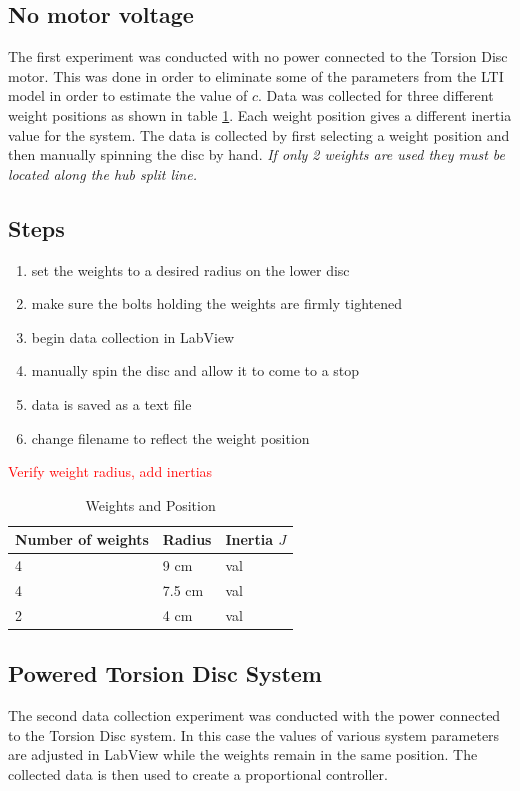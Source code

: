 \documentclass[11pt,titlepage]{article}
\begin{document}
	\subsection{No motor voltage}
		The first experiment was conducted with no power connected to the Torsion Disc motor. This was done in order to eliminate some of the parameters from the LTI model in order to estimate the value of $c$. Data was collected for three different weight positions as shown in table \ref{table:weight_pos}. Each weight position gives a different inertia value for the system. The data is collected by first selecting a weight position and then manually spinning the disc by hand. \emph{If only 2 weights are used they must be located along the hub split line.}
	\subsection*{Steps}
		\begin{enumerate}
			\item set the weights to a desired radius on the lower disc
			\item make sure the bolts holding the weights are firmly tightened
			\item begin data collection in LabView
			\item manually spin the disc and allow it to come to a stop
			\item data is saved as a text file
			\item change filename to reflect the weight position
		\end{enumerate}
			\textcolor{red}{Verify weight radius, add inertias}
		\begin{table}[h!]
			\centering
			\begin{tabular}{|m{4cm}|m{3cm}|m{3cm}|} 
				\hline
				Number of weights & Radius & Inertia $J$ \\ 
				\hline
				4 & 9 cm & val \\
				\hline
				4 & 7.5 cm & val\\
				\hline
				2 & 4 cm & val \\
				\hline
			\end{tabular}
			\caption{Weights and Position} \label{table:weight_pos}
		\end{table}
	\subsection{Powered Torsion Disc System}
	The second data collection experiment was conducted with the power connected to the Torsion Disc system. In this case the values of various system parameters are adjusted in LabView while the weights remain in the same position. The collected data is then used to create a proportional controller.
\end{document}

